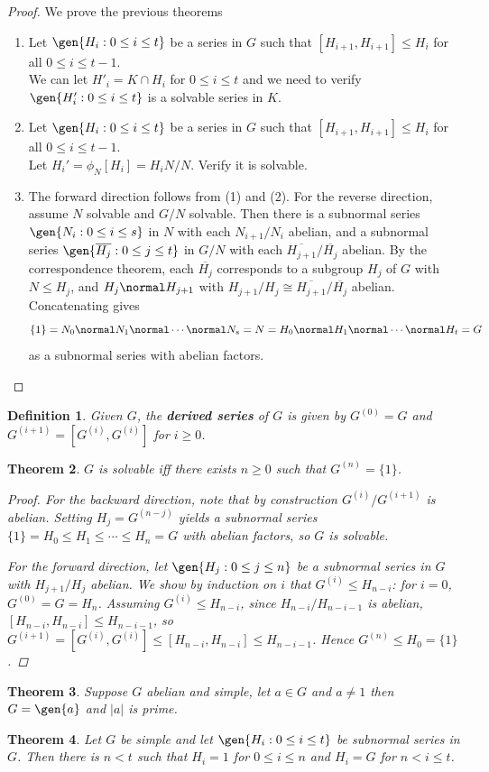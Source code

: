 \documentclass[a4paper,12pt]{article}
\newtheorem{thm}{Theorem}[section]
\newtheorem{defn}[thm]{Definition}
\begin{document}
\begin{proof}
    We prove the previous theorems
    \begin{enumerate}
        \item Let $\gen{H_i : 0\leq i \leq t}$ be a series in $G$ such that $[H_{i+1},H_{i+1}]\leq H_i$ for all $0\leq i \leq t-1$. \\
        We can let $H'_i=K\cap H_i$ for $0\leq i \leq t$ and we need to verify $\gen{H'_i : 0\leq i \leq t}$ is a solvable series in $K$.
        \item Let $\gen{H_i : 0\leq i \leq t}$ be a series in $G$ such that $[H_{i+1},H_{i+1}]\leq H_i$ for all $0\leq i \leq t-1$. \\
        Let $H_i'=\phi_N[H_i]=H_iN/N$. Verify it is solvable. 
        \item The forward direction follows from (1) and (2). For the reverse direction, assume $N$ solvable and $G/N$ solvable. Then there is a subnormal series $\gen{N_i : 0\leq i \leq s}$ in $N$ with each $N_{i+1}/N_i$ abelian, and a subnormal series $\gen{\overline{H_j} : 0\leq j \leq t}$ in $G/N$ with each $\overline{H_{j+1}}/\overline{H_j}$ abelian. By the correspondence theorem, each $\overline{H_j}$ corresponds to a subgroup $H_j$ of $G$ with $N\leq H_j$, and $H_j\normal H_{j+1}$ with $H_{j+1}/H_j\cong \overline{H_{j+1}}/\overline{H_j}$ abelian. Concatenating gives
        \[
        \{1\}=N_0\normal N_1 \normal \cdots \normal N_s=N=H_0\normal H_1 \normal \cdots \normal H_t=G
        \]
        as a subnormal series with abelian factors.
    \end{enumerate}
\end{proof}
\begin{defn}
    Given $G$, the \textbf{derived series} of $G$ is given by $G^{(0)}=G$ and $G^{(i+1)}=[G^{(i)},G^{(i)}]$ for $i\geq 0$.
\end{defn}
\begin{thm}
    $G$ is solvable iff there exists $n\geq 0$ such that $G^{(n)}=\{1\}$.
    \begin{proof}
        For the backward direction, note that by construction $G^{(i)}/G^{(i+1)}$ is abelian. Setting $H_j=G^{(n-j)}$ yields a subnormal series $\{1\}=H_0\leq H_1\leq\cdots\leq H_n=G$ with abelian factors, so $G$ is solvable.
        
        For the forward direction, let $\gen{H_j : 0\leq j \leq n}$ be a subnormal series in $G$ with $H_{j+1}/H_j$ abelian. We show by induction on $i$ that $G^{(i)}\leq H_{n-i}$: for $i=0$, $G^{(0)}=G=H_n$. Assuming $G^{(i)}\leq H_{n-i}$, since $H_{n-i}/H_{n-i-1}$ is abelian, $[H_{n-i},H_{n-i}]\leq H_{n-i-1}$, so $G^{(i+1)}=[G^{(i)},G^{(i)}]\leq [H_{n-i},H_{n-i}]\leq H_{n-i-1}$. Hence $G^{(n)}\leq H_0=\{1\}$.
    \end{proof}
\end{thm}
\begin{thm}
    Suppose $G$ abelian and simple, let $a\in G$ and $a\neq 1$ then $G=\gen{a}$ and $|a|$ is prime. 
\end{thm}
\begin{thm}
    Let $G$ be simple and let $\gen{H_i : 0\leq i \leq t}$ be subnormal series in $G$. Then there is $n<t$ such that $H_i=1$ for $0\leq i \leq n$ and $H_i=G$ for $n<i\leq t$.
\end{thm}
\newpage
\end{document}

